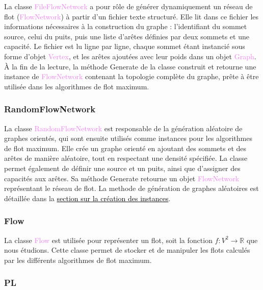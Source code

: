 \documentclass[a4paper]{article}
\begin{document}
La classe \textcolor{violet}{FileFlowNetwork} a pour rôle de générer dynamiquement un réseau de flot (\textcolor{violet}{FlowNetwork}) à partir d’un fichier texte structuré. Elle lit dans ce fichier les informations nécessaires à la construction du graphe : l'identifiant du sommet source, celui du puits, puis une liste d’arêtes définies par deux sommets et une capacité. Le fichier est lu ligne par ligne, chaque sommet étant instancié sous forme d’objet \textcolor{violet}{Vertex}, et les arêtes ajoutées avec leur poids dans un objet \textcolor{violet}{Graph}. À la fin de la lecture, la méthode \textcolor{green!60!black}{Generate} de la classe construit et retourne une instance de \textcolor{violet}{FlowNetwork} contenant la topologie complète du graphe, prête à être utilisée dans les algorithmes de flot maximum.

\subsubsection{RandomFlowNetwork}
La classe \textcolor{violet}{RandomFlowNetwork} est responsable de la génération aléatoire de graphes orientés, qui sont ensuite utilisés comme instances pour les algorithmes de flot maximum. Elle crée un graphe orienté en ajoutant des sommets et des arêtes de manière aléatoire, tout en respectant une densité spécifiée. La classe permet également de définir une source et un puits, ainsi que d'assigner des capacités aux arêtes. Sa méthode \textcolor{green!60!black}{Generate} retourne un objet \textcolor{violet}{FlowNetwork} représentant le réseau de flot. La methode de génération de graphes aléatoires est détaillée dans la \hyperref[sec:creer_instances]{\textcolor{black}{section sur la création des instances}}.

\subsubsection{Flow}

La classe \textcolor{violet}{Flow} est utilisée pour représenter un flot, soit la fonction $f : V^2 \to \mathbb{R}$ que nous étudions. Cette classe permet de stocker et de manipuler les flots calculés par les différents algorithmes de flot maximum.

\subsubsection{PL}
\end{document}
